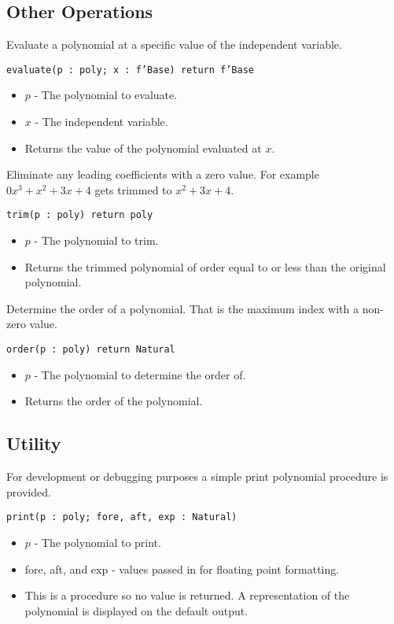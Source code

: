 \documentclass[10pt, openany]{book}
\newcommand{\function}[1]{\texttt{#1}}
\begin{document}
\subsection{Other Operations}

Evaluate a polynomial at a specific value of the independent variable.

\function{evaluate(p : poly; x : f'Base) return f'Base}
\begin{itemize}
  \item $p$ - The polynomial to evaluate.
  \item $x$ - The independent variable.
  \item Returns the value of the polynomial evaluated at $x$.
\end{itemize}

Eliminate any leading coefficients with a zero value.  For example $0x^3+x^2+3x+4$ gets trimmed to $x^2+3x+4$.

\function{trim(p : poly) return poly}
\begin{itemize}
  \item $p$ - The polynomial to trim.
  \item Returns the trimmed polynomial of order equal to or less than the original polynomial.
\end{itemize}

Determine the order of a polynomial.  That is the maximum index with a non-zero value.

\function{order(p : poly) return Natural}
\begin{itemize}
  \item $p$ - The polynomial to determine the order of.
  \item Returns the order of the polynomial.
\end{itemize}

\subsection{Utility}
For development or debugging purposes a simple print polynomial procedure is provided.

\function{print(p : poly; fore, aft, exp : Natural)}
\begin{itemize}
  \item $p$ - The polynomial to print.
  \item fore, aft, and exp - values passed in for floating point formatting.
  \item This is a procedure so no value is returned.  A representation of the polynomial is displayed on the default output.
\end{itemize}
\end{document}
